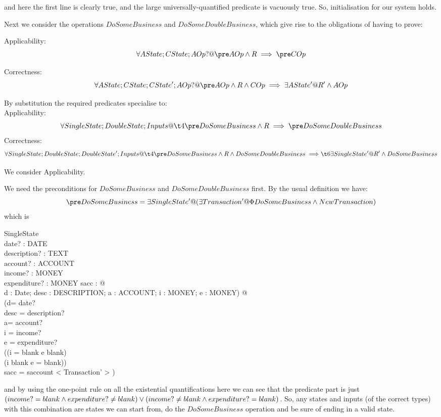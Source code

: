 \documentclass[11pt]{amsart}
\begin{document}
\noindent and here the first line is clearly true, and the large universally-quantified predicate is vacuously true. So, initialisation for our system holds.

Next we consider the operations $DoSomeBusiness$ and $DoSomeDoubleBusiness$, which give rise to the obligations of having to prove:

\noindent Applicability:
\[
\forall AState; CState; AOp? @ \pre AOp \land R \implies \pre COp
\]

\noindent Correctness:
\[
\forall AState; CState; CState'; AOp? @ \pre AOp \land R \land COp \implies \exists AState' @ R' \land AOp
\]

By substitution the required predicates specialise to:\\

\noindent Applicability:
\[
\forall SingleState; DoubleState; Inputs @\\
\t4 \pre DoSomeBusiness \land R \implies \pre DoSomeDoubleBusiness
\]
\noindent Correctness:
\[
\forall SingleState; DoubleState; DoubleState'; Inputs @\\
\t4  \pre DoSomeBusiness \land R \land DoSomeDoubleBusiness \implies \\
\t6 \exists SingleState' @ R' \land DoSomeBusiness
\]

We consider Applicability.

We need the preconditions for $DoSomeBusiness$ and $DoSomeDoubleBusiness$ first. By the usual definition we have:
\[
\pre DoSomeBusiness = \exists SingleState' @ (\exists Transaction' @ \Phi DoSomeBusiness \land NewTransaction)
\]
which is
\begin{schema} {}
SingleState\\
date? : DATE\\
description? : TEXT\\
account? : ACCOUNT\\ 
income? : MONEY\\
expenditure? : MONEY
\where
\exists sacc : \seq[Transaction] @\\
      \exists d : Date; desc : DESCRIPTION; a : ACCOUNT; i  : MONEY; e : MONEY) @\\
           (d= date? \land\\
            desc = description? \land \\
            a= account? \land \\
            i = income? \land \\
            e = expenditure? \land \\
            ((i = blank \land e \neq blank) \lor\\ (i \neq blank \land e = blank)) \land\\
            sacc = saccount \cat < \theta Transaction' > )
\end{schema}
\noindent and by using the one-point rule on all the existential quantifications here we can see that the predicate part is just $(income?= blank \land expenditure? \neq blank) \lor\\ (income? \neq blank \land expenditure? = blank)$. So, any states and inputs (of the correct types) with this combination are states we can start from, do the $DoSomeBusiness$ operation and be sure of ending in a valid state.
\end{document}
